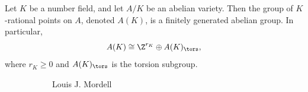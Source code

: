 \begin{frame}
	\begin{thm}
	Let $K$ be a number field, and let $A/K$ be an abelian variety. Then the group of $K$-rational points on $A$, denoted $A(K)$, is a finitely generated abelian group. In particular,
		\[
		A(K) \cong \Z^{r_K} \oplus A(K)_\tors,
		\]
	where $r_K \geq 0$ and $A(K)_\tors$ is the torsion subgroup.
	\end{thm}
	\begin{figure}[h]
	\centering
	\begin{subfigure}{0.3\textwidth}
	\captionsetup{labelformat=empty}
	\centering
	\caption{Louis J. Mordell}
	\end{subfigure}
	\begin{subfigure}{0.3\textwidth}
	\captionsetup{labelformat=empty}
	\centering

\end{subfigure}
\end{figure}
\end{frame}
